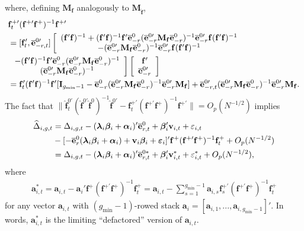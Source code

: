 \documentclass[12pt,fleqn]{article}
\def\*#1{\mathbf{#1}}
\def\+#1{\boldsymbol{#1}}
\begin{document}
where, defining $\*M_{\*f}$ analogously to $\*M_{\widehat{\*f}}$,
\begin{align}
& \*f_t^{+\prime}(\*f^{+\prime}\*f^+)^{-1}\*f^{+\prime} \notag\\
& = [\*f_t', \overline{\*e}_{-r,t}^{0\prime}]\left[\begin{array}{c} (\*f'\*f)^{-1} + (\*f'\*f)^{-1}\*f'\overline{\*e}_{-r}^0(\overline{\*e}_{-r}^{0\prime}\*M_{\*f}\overline{\*e}_{-r}^0)^{-1}\overline{\*e}_{-r}^{0\prime} \*f(\*f'\*f)^{-1}  \\
-(\overline{\*e}_{-r}^{0\prime}\*M_{\*f}\overline{\*e}_{-r}^0)^{-1}\overline{\*e}_{-r}^{0\prime}\*f (\*f'\*f)^{-1} \end{array}\right. \notag\\
& \left. \begin{array}{c}  -(\*f'\*f)^{-1}\*f'\overline{\*e}_{-r}^0(\overline{\*e}_{-r}^{0\prime}\*M_{\*f}\overline{\*e}_{-r}^0)^{-1} \\
 (\overline{\*e}_{-r}^{0\prime}\*M_{\*f}\overline{\*e}_{-r}^0)^{-1} \end{array}\right]\left[\begin{array}{c} \*f' \\
    \overline{\*e}_{-r}^{0\prime} \end{array}\right]  \notag\\
& = \*f_t'(\*f'\*f)^{-1}\*f'[\*I_{g_{\min}-1} -  \overline{\*e}_{-r}^{0}(\overline{\*e}_{-r}^{0\prime}\*M_{\*f}\overline{\*e}_{-r}^0)^{-1} \overline{\*e}_{-r}^{0\prime}\*M_{\*f}] + \overline{\*e}_{-r,t}^{0\prime}(\overline{\*e}_{-r}^{0\prime}\*M_{\*f}\overline{\*e}_{-r}^0)^{-1}\overline{\*e}_{-r}^{0\prime}\*M_{\*f}.
\end{align}
The fact that $\|\widehat{\*f}_t^{0\prime}(\widehat{\*f}^{0\prime}\widehat{\*f}^0)^{-1}\widehat{\*f}^{0\prime} - \*f_t^{+\prime}(\*f^{+\prime}\*f^+)^{-1}\*f^{+\prime}\| = O_p(N^{-1/2})$ implies
\begin{align}
\widehat \Delta_{i,g,t} & = \Delta_{i,g,t} - (\+\lambda_i\+\beta_i + \+\alpha_i)'\overline{\*e}_{r,t}^0 + \+\beta_i'\*v_{i,t} + \varepsilon_{i,t} \notag\\
& - [ - \overline{\*e}_{r}^0(\+\lambda_i\+\beta_i +\+\alpha_i) + \*v_i\+\beta_i+  \+\varepsilon_{i} ]'  \*f^{+} (\*f^{+\prime}\*f^+)^{-1}\*f_t^+ + O_p(N^{-1/2})\notag\\
& = \Delta_{i,g,t} - (\+\lambda_i\+\beta_i + \+\alpha_i)'\overline{\*e}_{r,t}^{0\ast} + \+\beta_i'\*v_{i,t}^* + \varepsilon_{i,t}^*  + O_p(N^{-1/2}),
\end{align}
where
\begin{align}
\*a_{i,t}^* = \*a_{i,t} - \*a_i' \*f^{+} (\*f^{+\prime}\*f^+)^{-1}\*f_t^+ = \*a_{i,t} - \sum_{s=1}^{g_{\min}-1} \*a_{i,s}\*f_s^{+\prime} (\*f^{+\prime}\*f^+)^{-1}\*f_t^+
\end{align}
for any vector $\*a_{i,t}$ with $(g_{\min}-1)$-rowed stack $\*a_i = [\*a_{i,1},...,\*a_{i,g_{\min}-1}]'$. In words, $\*a_{i,t}^*$ is the limiting ``defactored'' version of $\*a_{i,t}$.
\end{document}
